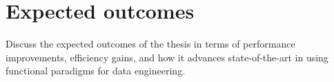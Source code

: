 \chapter{Expected outcomes}

Discuss the expected outcomes of the thesis in terms of performance improvements, efficiency gains, and how it advances state-of-the-art in using functional paradigms for data engineering.
